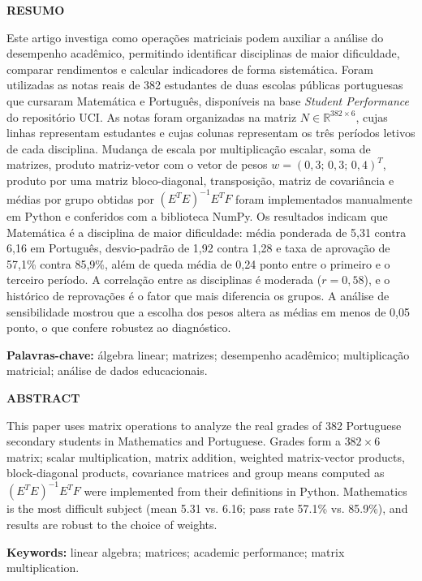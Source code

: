\documentclass[12pt,a4paper]{article}
\newcommand{\R}{\mathbb{R}}
\begin{document}
\begin{singlespace}
\noindent\textbf{RESUMO}\par\vspace{3pt}
\noindent Este artigo investiga como operações matriciais podem auxiliar a análise do desempenho acadêmico, permitindo identificar disciplinas de maior dificuldade, comparar rendimentos e calcular indicadores de forma sistemática. Foram utilizadas as notas reais de 382 estudantes de duas escolas públicas portuguesas que cursaram Matemática e Português, disponíveis na base \textit{Student Performance} do repositório UCI. As notas foram organizadas na matriz $N \in \R^{382\times 6}$, cujas linhas representam estudantes e cujas colunas representam os três períodos letivos de cada disciplina. Mudança de escala por multiplicação escalar, soma de matrizes, produto matriz-vetor com o vetor de pesos $w=(0{,}3;\,0{,}3;\,0{,}4)^T$, produto por uma matriz bloco-diagonal, transposição, matriz de covariância e médias por grupo obtidas por $(E^TE)^{-1}E^TF$ foram implementados manualmente em Python e conferidos com a biblioteca NumPy. Os resultados indicam que Matemática é a disciplina de maior dificuldade: média ponderada de 5,31 contra 6,16 em Português, desvio-padrão de 1,92 contra 1,28 e taxa de aprovação de 57,1\% contra 85,9\%, além de queda média de 0,24 ponto entre o primeiro e o terceiro período. A correlação entre as disciplinas é moderada ($r=0{,}58$), e o histórico de reprovações é o fator que mais diferencia os grupos. A análise de sensibilidade mostrou que a escolha dos pesos altera as médias em menos de 0,05 ponto, o que confere robustez ao diagnóstico.

\vspace{4pt}
\noindent\textbf{Palavras-chave:} álgebra linear; matrizes; desempenho acadêmico; multiplicação matricial; análise de dados educacionais.

\vspace{8pt}
\noindent\textbf{ABSTRACT}\par\vspace{3pt}
\noindent This paper uses matrix operations to analyze the real grades of 382 Portuguese secondary students in Mathematics and Portuguese. Grades form a $382\times 6$ matrix; scalar multiplication, matrix addition, weighted matrix-vector products, block-diagonal products, covariance matrices and group means computed as $(E^TE)^{-1}E^TF$ were implemented from their definitions in Python. Mathematics is the most difficult subject (mean 5.31 vs. 6.16; pass rate 57.1\% vs. 85.9\%), and results are robust to the choice of weights.

\vspace{4pt}
\noindent\textbf{Keywords:} linear algebra; matrices; academic performance; matrix multiplication.
\end{singlespace}
\end{document}
